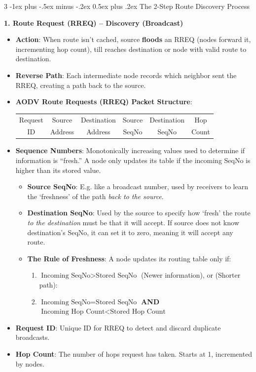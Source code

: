 \documentclass[a4paper, 9pt, landscape]{extarticle}
\makeatletter
\renewcommand{\subsubsection}{\@startsection{paragraph}{4}{0mm}%
                                {-1ex plus -.5ex minus -.2ex}%
                                {0.5ex plus .2ex}%
                                {\normalfont\footnotesize\bfseries}}
\makeatother
\begin{document}
\begin{multicols*}{3}
\subsubsection{The 2-Step Route Discovery Process}

\textbf{1. Route Request (RREQ) -- Discovery (Broadcast)}
\begin{itemize}
  \item \textbf{Action}: When route isn't cached, source \textbf{floods} an RREQ (nodes forward it, incrementing hop count), till reaches destination or node with valid route to destination.
  \item \textbf{Reverse Path}: Each intermediate node records which neighbor sent the RREQ, creating a path back to the source.
  \item \textbf{AODV Route Requests (RREQ) Packet Structure}:
  \begin{center}
    \begin{tabular}{|c|c|c|c|c|c|}
    \hline
    Request & Source & Destination & Source & Destination & \cellcolor{orange!60}Hop \\
    ID & Address & Address & SeqNo & SeqNo & \cellcolor{orange!60}Count \\
    \hline
    \end{tabular}
  \end{center}
  \item \textbf{Sequence Numbers}: Monotonically increasing values used to determine if information is ``fresh.'' A node only updates its table if the incoming SeqNo is higher than its stored value.
  \begin{itemize}
    \item \textbf{Source SeqNo}: E.g. like a broadcast number, used by receivers to learn the `freshness' of the path \textit{back to the source}.
    \item \textbf{Destination SeqNo}: Used by the source to specify how `fresh' the route \textit{to the destination} must be that it will accept. If source does not know destination's SeqNo, it can set it to zero, meaning it will accept any route.
    \item \textbf{The Rule of Freshness}: A node updates its routing table only if:
      \begin{enumerate}
          \item $\text{Incoming SeqNo} > \text{Stored SeqNo}$ (Newer information), or (Shorter path):
          \item $\text{Incoming SeqNo} = \text{Stored SeqNo}$ \textbf{AND} $\text{Incoming Hop Count} < \text{Stored Hop Count}$
      \end{enumerate}
  \end{itemize}
  \item \textbf{Request ID}: Unique ID for RREQ to detect and discard duplicate broadcasts.
  \item \textbf{Hop Count}: The number of hops request has taken. Starts at 1, incremented by nodes.
\end{itemize}


\end{multicols*}
\end{document}
